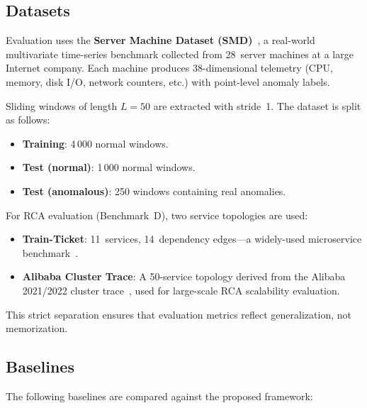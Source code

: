 \subsection{Datasets}
\label{subsec:eval_datasets}

Evaluation uses the \textbf{Server Machine Dataset (SMD)}~\cite{su2019robust},
a real-world multivariate time-series benchmark collected from 28~server
machines at a large Internet company. Each machine produces 38-dimensional
telemetry (CPU, memory, disk I/O, network counters, etc.) with
point-level anomaly labels.

Sliding windows of length $L=50$ are extracted with stride~1.
The dataset is split as follows:

\begin{itemize}
    \item \textbf{Training}: 4\,000 normal windows.
    \item \textbf{Test (normal)}: 1\,000 normal windows.
    \item \textbf{Test (anomalous)}: 250 windows containing real anomalies.
\end{itemize}

For RCA evaluation (Benchmark~D), two service topologies are used:
\begin{itemize}
    \item \textbf{Train-Ticket}: 11~services, 14~dependency edges---a
    widely-used microservice benchmark~\cite{zhou2018trainticket}.
    \item \textbf{Alibaba Cluster Trace}: A 50-service topology derived from
    the Alibaba 2021/2022 cluster trace~\cite{alibaba2022cluster},
    used for large-scale RCA scalability evaluation.
\end{itemize}

This strict separation ensures that evaluation metrics reflect
generalization, not memorization.

\subsection{Baselines}
\label{subsec:eval_baselines}

The following baselines are compared against the proposed framework:

